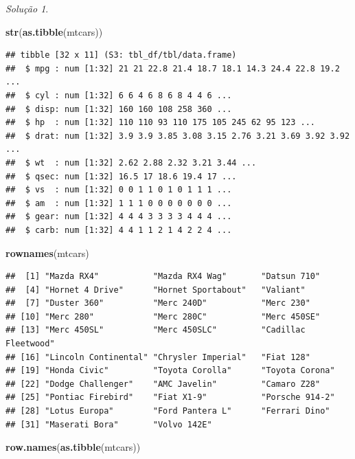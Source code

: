 \documentclass[
]{latex/krantz}
\newenvironment{Shaded}{\begin{snugshade}}{\end{snugshade}}
\newcommand{\FunctionTok}[1]{\textcolor[rgb]{0.13,0.29,0.53}{\textbf{#1}}}
\newcommand{\NormalTok}[1]{#1}
\theoremstyle{definition}
\theoremstyle{definition}
\theoremstyle{definition}
\theoremstyle{definition}
\theoremstyle{remark}
\newtheorem*{solution}{Solução}
\begin{document}
\begin{solution}
\begin{Shaded}
\begin{Highlighting}[]
\FunctionTok{str}\NormalTok{(}\FunctionTok{as.tibble}\NormalTok{(mtcars))}
\end{Highlighting}
\end{Shaded}

\begin{verbatim}
## tibble [32 x 11] (S3: tbl_df/tbl/data.frame)
##  $ mpg : num [1:32] 21 21 22.8 21.4 18.7 18.1 14.3 24.4 22.8 19.2 ...
##  $ cyl : num [1:32] 6 6 4 6 8 6 8 4 4 6 ...
##  $ disp: num [1:32] 160 160 108 258 360 ...
##  $ hp  : num [1:32] 110 110 93 110 175 105 245 62 95 123 ...
##  $ drat: num [1:32] 3.9 3.9 3.85 3.08 3.15 2.76 3.21 3.69 3.92 3.92 ...
##  $ wt  : num [1:32] 2.62 2.88 2.32 3.21 3.44 ...
##  $ qsec: num [1:32] 16.5 17 18.6 19.4 17 ...
##  $ vs  : num [1:32] 0 0 1 1 0 1 0 1 1 1 ...
##  $ am  : num [1:32] 1 1 1 0 0 0 0 0 0 0 ...
##  $ gear: num [1:32] 4 4 4 3 3 3 3 4 4 4 ...
##  $ carb: num [1:32] 4 4 1 1 2 1 4 2 2 4 ...
\end{verbatim}

\begin{Shaded}
\begin{Highlighting}[]
\FunctionTok{rownames}\NormalTok{(mtcars)}
\end{Highlighting}
\end{Shaded}

\begin{verbatim}
##  [1] "Mazda RX4"           "Mazda RX4 Wag"       "Datsun 710"         
##  [4] "Hornet 4 Drive"      "Hornet Sportabout"   "Valiant"            
##  [7] "Duster 360"          "Merc 240D"           "Merc 230"           
## [10] "Merc 280"            "Merc 280C"           "Merc 450SE"         
## [13] "Merc 450SL"          "Merc 450SLC"         "Cadillac Fleetwood" 
## [16] "Lincoln Continental" "Chrysler Imperial"   "Fiat 128"           
## [19] "Honda Civic"         "Toyota Corolla"      "Toyota Corona"      
## [22] "Dodge Challenger"    "AMC Javelin"         "Camaro Z28"         
## [25] "Pontiac Firebird"    "Fiat X1-9"           "Porsche 914-2"      
## [28] "Lotus Europa"        "Ford Pantera L"      "Ferrari Dino"       
## [31] "Maserati Bora"       "Volvo 142E"
\end{verbatim}

\begin{Shaded}
\begin{Highlighting}[]
\FunctionTok{row.names}\NormalTok{(}\FunctionTok{as.tibble}\NormalTok{(mtcars))}
\end{Highlighting}
\end{Shaded}


\end{solution}
\end{document}
